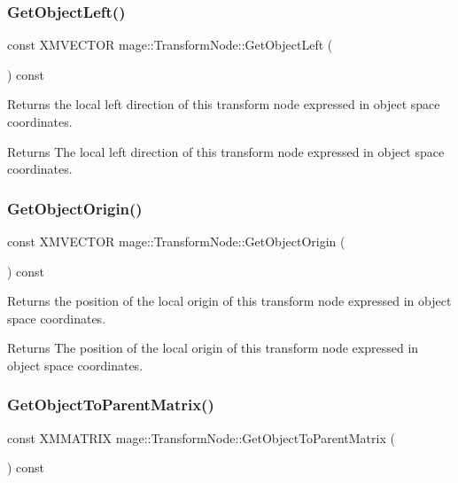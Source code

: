 \subsubsection{\texorpdfstring{Get\+Object\+Left()}{GetObjectLeft()}}
{\footnotesize\ttfamily const X\+M\+V\+E\+C\+T\+OR mage\+::\+Transform\+Node\+::\+Get\+Object\+Left (\begin{DoxyParamCaption}{ }\end{DoxyParamCaption}) const}

Returns the local left direction of this transform node expressed in object space coordinates.

\begin{DoxyReturn}{Returns}
The local left direction of this transform node expressed in object space coordinates. 
\end{DoxyReturn}
\hypertarget{classmage_1_1_transform_node_adc1edf6bde3772904073b360f17a65d2}{}\label{classmage_1_1_transform_node_adc1edf6bde3772904073b360f17a65d2} 
\subsubsection{\texorpdfstring{Get\+Object\+Origin()}{GetObjectOrigin()}}
{\footnotesize\ttfamily const X\+M\+V\+E\+C\+T\+OR mage\+::\+Transform\+Node\+::\+Get\+Object\+Origin (\begin{DoxyParamCaption}{ }\end{DoxyParamCaption}) const}

Returns the position of the local origin of this transform node expressed in object space coordinates.

\begin{DoxyReturn}{Returns}
The position of the local origin of this transform node expressed in object space coordinates. 
\end{DoxyReturn}
\hypertarget{classmage_1_1_transform_node_ae70e7e1ba6cf052397113a5ba90d5e98}{}\label{classmage_1_1_transform_node_ae70e7e1ba6cf052397113a5ba90d5e98} 
\subsubsection{\texorpdfstring{Get\+Object\+To\+Parent\+Matrix()}{GetObjectToParentMatrix()}}
{\footnotesize\ttfamily const X\+M\+M\+A\+T\+R\+IX mage\+::\+Transform\+Node\+::\+Get\+Object\+To\+Parent\+Matrix (\begin{DoxyParamCaption}{ }\end{DoxyParamCaption}) const}

